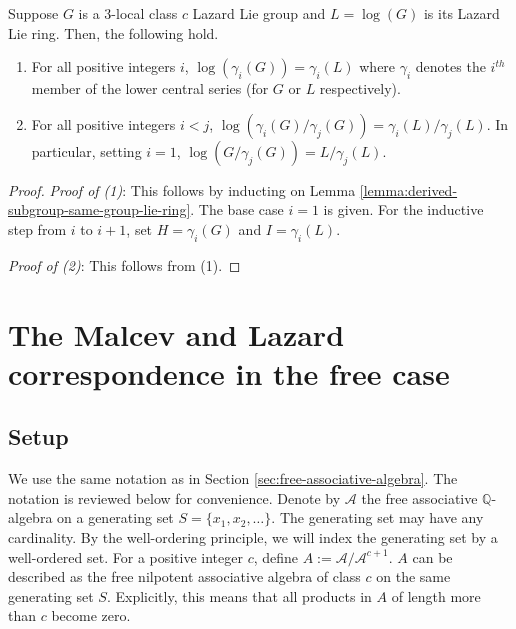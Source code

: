\begin{theorem}\label{thm:lazard-correspondence-lcs}
  Suppose $G$ is a $3$-local class $c$ Lazard Lie group and $L =
  \log(G)$ is its Lazard Lie ring. Then, the following hold.

  \begin{enumerate}
  \item For all positive integers $i$, $\log(\gamma_i(G)) =
    \gamma_i(L)$ where $\gamma_i$ denotes the $i^{th}$ member of the
    lower central series (for $G$ or $L$ respectively).
  \item For all positive integers $i < j$,
    $\log(\gamma_i(G)/\gamma_j(G)) = \gamma_i(L)/\gamma_j(L)$. In
    particular, setting $i = 1$, $\log(G/\gamma_j(G)) =
    L/\gamma_j(L)$.
  \end{enumerate}
\end{theorem}

\begin{proof}
  {\em Proof of (1)}: This follows by inducting on Lemma
  \ref{lemma:derived-subgroup-same-group-lie-ring}. The base case $i =
  1$ is given. For the inductive step from $i$ to $i + 1$, set $H =
  \gamma_i(G)$ and $I = \gamma_i(L)$.

  {\em Proof of (2)}: This follows from (1).
\end{proof}


\section{The Malcev and Lazard correspondence in the free case}\label{sec:malcev-lazard-free}

\subsection{Setup}\label{sec:malcev-lazard-free-setup}

We use the same notation as in Section
\ref{sec:free-associative-algebra}. The notation is reviewed below for
convenience. Denote by $\mathcal{A}$ the free associative
$\mathbb{Q}$-algebra on a generating set $S = \{ x_1,x_2,\dots
\}$. The generating set may have any cardinality. By the well-ordering
principle, we will index the generating set by a well-ordered set. For
a positive integer $c$, define $A :=
\mathcal{A}/\mathcal{A}^{c+1}$. $A$ can be described as the free
nilpotent associative algebra of class $c$ on the same generating set
$S$. Explicitly, this means that all products in $A$ of length more
than $c$ become zero.

